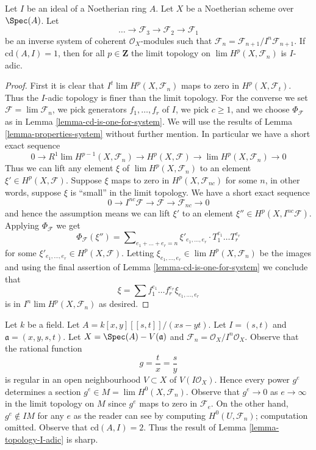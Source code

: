 \begin{lemma}
\label{lemma-topology-I-adic}
Let $I$ be an ideal of a Noetherian ring $A$. Let $X$ be a Noetherian scheme
over $\Spec(A)$. Let
$$
\ldots \to \mathcal{F}_3 \to \mathcal{F}_2 \to \mathcal{F}_1
$$
be an inverse system of coherent $\mathcal{O}_X$-modules
such that $\mathcal{F}_n = \mathcal{F}_{n + 1}/I^n\mathcal{F}_{n + 1}$.
If $\text{cd}(A, I) = 1$, then for all $p \in \mathbf{Z}$ the limit topology on
$\lim H^p(X, \mathcal{F}_n)$ is $I$-adic.
\end{lemma}

\begin{proof}
First it is clear that $I^t \lim H^p(X, \mathcal{F}_n)$
maps to zero in $H^p(X, \mathcal{F}_t)$. Thus the $I$-adic topology
is finer than the limit topology. For the converse we set
$\mathcal{F} = \lim \mathcal{F}_n$, we pick generators $f_1, \ldots, f_r$
of $I$, we pick $c \geq 1$, and we choose
$\Phi_\mathcal{F}$ as in Lemma \ref{lemma-cd-is-one-for-system}.
We will use the results of Lemma \ref{lemma-properties-system}
without further mention. In particular we have a short exact
sequence
$$
0 \to R^1\lim H^{p - 1}(X, \mathcal{F}_n) \to H^p(X, \mathcal{F})
\to \lim H^p(X, \mathcal{F}_n) \to 0
$$
Thus we can lift any element $\xi$ of $\lim H^p(X, \mathcal{F}_n)$
to an element $\xi' \in H^p(X, \mathcal{F})$. Suppose $\xi$ maps to zero
in $H^p(X, \mathcal{F}_{nc})$ for some $n$, in other
words, suppose $\xi$ is ``small'' in the limit topology. We have a
short exact sequence
$$
0 \to I^{nc}\mathcal{F} \to \mathcal{F} \to \mathcal{F}_{nc} \to 0
$$
and hence the assumption means we can lift $\xi'$ to an element
$\xi'' \in H^p(X, I^{nc}\mathcal{F})$. Applying $\Phi_\mathcal{F}$
we get
$$
\Phi_\mathcal{F}(\xi'') = \sum\nolimits_{e_1 + \ldots + e_r = n}
\xi'_{e_1, \ldots, e_r} \cdot T_1^{e_1} \ldots T_r^{e_r}
$$
for some $\xi'_{e_1, \ldots, e_r} \in H^p(X, \mathcal{F})$.
Letting $\xi_{e_1, \ldots, e_r} \in \lim H^p(X, \mathcal{F}_n)$
be the images and using the final assertion of
Lemma \ref{lemma-cd-is-one-for-system}
we conclude that
$$
\xi = \sum f_1^{e_1} \ldots f_r^{e_r} \xi_{e_1, \ldots, e_r}
$$
is in $I^n \lim H^p(X, \mathcal{F}_n)$ as desired.
\end{proof}

\begin{example}
\label{example-not-I-adic}
Let $k$ be a field. Let $A = k[x, y][[s, t]]/(xs - yt)$.
Let $I = (s, t)$ and $\mathfrak a = (x, y, s, t)$.
Let $X = \Spec(A) - V(\mathfrak a)$ and
$\mathcal{F}_n = \mathcal{O}_X/I^n\mathcal{O}_X$.
Observe that the rational function
$$
g = \frac{t}{x} = \frac{s}{y}
$$
is regular in an open neighbourhood $V \subset X$ of
$V(I\mathcal{O}_X)$. Hence every power $g^e$ determines a section
$g^e \in M = \lim H^0(X, \mathcal{F}_n)$. Observe that
$g^e \to 0$ as $e \to \infty$ in the limit topology on $M$
since $g^e$ maps to zero in $\mathcal{F}_e$.
On the other hand, $g^e \not \in IM$ for any $e$
as the reader can see by computing $H^0(U, \mathcal{F}_n)$;
computation omitted. Observe that $\text{cd}(A, I) = 2$.
Thus the result of Lemma \ref{lemma-topology-I-adic} is sharp.
\end{example}








